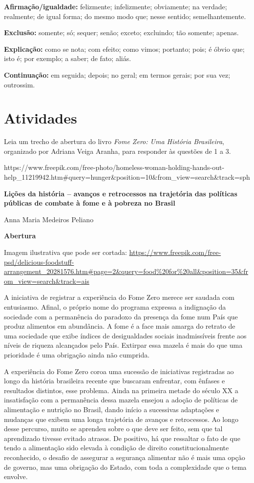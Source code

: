 {\begin{itemize}
{\textbf{Afirmação/igualdade:} felizmente; infelizmente; obviamente; na
verdade; realmente; de igual forma; do mesmo modo que; nesse sentido;
semelhantemente.

\textbf{Exclusão:} somente; só; sequer; senão; exceto; excluindo; tão
somente; apenas.

\textbf{Explicação:} como se nota; com efeito; como vimos; portanto;
pois; é óbvio que; isto é; por exemplo; a saber; de fato; aliás.

\textbf{Continuação:} em seguida; depois; no geral; em termos gerais;
por sua vez; outrossim.
}

\section{Atividades}

Leia um trecho de abertura do livro \emph{Fome Zero: Uma História
Brasileira}, organizado por Adriana Veiga Aranha, para responder às
questões de 1 a 3.

https://www.freepik.com/free-photo/homeless-woman-holding-hands-out-help\_11219942.htm\#query=hunger\&position=10\&from\_view=search\&track=sph

\textbf{Lições da história -- avanços e retrocessos na trajetória das
políticas públicas de combate à fome e à pobreza no Brasil}

Anna Maria Medeiros Peliano

\textbf{Abertura}

Imagem ilustrativa que pode ser cortada:
\url{https://www.freepik.com/free-psd/delicious-foodstuff-arrangement_20281576.htm\#page=2\&query=food\%20for\%20all\&position=35\&from_view=search\&track=ais}

A iniciativa de registrar a experiência do Fome Zero merece ser saudada
com entusiasmo. Afinal, o próprio nome do programa expressa a indignação
da sociedade com a permanência do paradoxo da presença da fome num País
que produz alimentos em abundância. A fome é a face mais amarga do
retrato de uma sociedade que exibe índices de desigualdades sociais
inadmissíveis frente aos níveis de riqueza alcançados pelo País.
Extirpar essa mazela é mais do que uma prioridade é uma obrigação ainda
não cumprida.

A experiência do Fome Zero coroa uma sucessão de iniciativas registradas
ao longo da história brasileira recente que buscaram enfrentar, com
ênfases e resultados distintos, esse problema. Ainda na primeira metade
do século XX a insatisfação com a permanência dessa mazela ensejou a
adoção de políticas de alimentação e nutrição no Brasil, dando início a
sucessivas adaptações e mudanças que exibem uma longa trajetória de
avanços e retrocessos. Ao longo desse percurso, muito se aprendeu sobre
o que deve ser feito, sem que tal aprendizado tivesse evitado atrasos.
De positivo, há que ressaltar o fato de que tendo a alimentação sido
elevada à condição de direito constitucionalmente reconhecido, o desafio
de assegurar a segurança alimentar não é mais uma opção de governo, mas
uma obrigação do Estado, com toda a complexidade que o tema envolve.


\end{itemize}}
